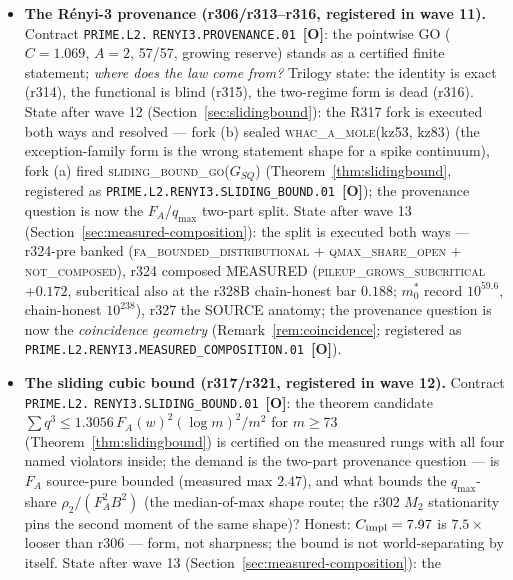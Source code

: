 \documentclass[11pt]{article}
\newcommand{\mE}{\textcolor{certgreen}{\textbf{[E]}}}
\newcommand{\mO}{\textcolor{openred}{\textbf{[O]}}}
\theoremstyle{definition}
\theoremstyle{remark}
\begin{document}
\begin{itemize}[leftmargin=2em]
(\texttt{PRIME.SOURCE.RANKONE.UPDATE.IDENTITY.01}~\mE)?  Registered
\emph{after} the documented negatives (Remark~\ref{rem:claimsplit}):
no transfer-operator contraction at chain level
(\textsc{floquet\_expanding}), no type-majorant composition, no
two-regime pointwise majorant under a mid-ladder freeze.
\item \textbf{The R\'enyi-3 provenance (r306/r313--r316, registered
in wave 11).}  Contract \texttt{PRIME.L2.}\allowbreak
\texttt{RENYI3.PROVENANCE.01}~\mO: the pointwise GO ($C = 1.069$,
$A = 2$, 57/57, growing reserve) stands as a certified finite
statement; \emph{where does the law come from?}  Trilogy state:
the identity is exact (r314), the functional is blind (r315), the
two-regime form is dead (r316).  State after wave 12
(Section~\ref{sec:slidingbound}): the R317 fork is executed both
ways and resolved --- fork (b) sealed \textsc{whac\_a\_mole}(kz53,
kz83) (the exception-family form is the wrong statement shape for
a spike continuum), fork (a) fired
\textsc{sliding\_bound\_go}($G_{SQ}$)
(Theorem~\ref{thm:slidingbound}, registered as
\texttt{PRIME.L2.RENYI3.SLIDING\_BOUND.01}~\mO); the provenance
question is now the $F_A$/$q_{\max}$ two-part split.  State after
wave 13 (Section~\ref{sec:measured-composition}): the split is
executed both ways --- r324-pre banked
(\textsc{fa\_bounded\_distributional} $+$
\textsc{qmax\_share\_open} $+$ \textsc{not\_composed}), r324
composed MEASURED (\textsc{pileup\_grows\_subcritical} $+0.172$,
subcritical also at the r328B chain-honest bar $0.188$; $m_0^*$
record $10^{59.6}$, chain-honest $10^{238}$), r327 the SOURCE
anatomy; the provenance
question is now the \emph{coincidence geometry}
(Remark~\ref{rem:coincidence}; registered as
\texttt{PRIME.L2.RENYI3.MEASURED\_COMPOSITION.01}~\mO).
\item \textbf{The sliding cubic bound (r317/r321, registered in
wave 12).}  Contract \texttt{PRIME.L2.}\allowbreak
\texttt{RENYI3.SLIDING\_BOUND.01}~\mO: the theorem candidate
$\sum q^3 \le 1.3056\,F_A(w)^2 (\log m)^2/m^2$ for $m \ge 73$
(Theorem~\ref{thm:slidingbound}) is certified on the measured
rungs with all four named violators inside; the demand is the
two-part provenance question --- is $F_A$ source-pure bounded
(measured max $2.47$), and what bounds the $q_{\max}$-share
$\rho_2/(F_A^2 B^2)$ (the median-of-max shape route; the r302
$M_2$ stationarity pins the second moment of the same shape)?
Honest: $C_{\rm impl} = 7.97$ is $7.5\times$ looser than r306 ---
form, not sharpness; the bound is not world-separating by itself.
State after wave 13 (Section~\ref{sec:measured-composition}): the

\end{itemize}
\end{document}
